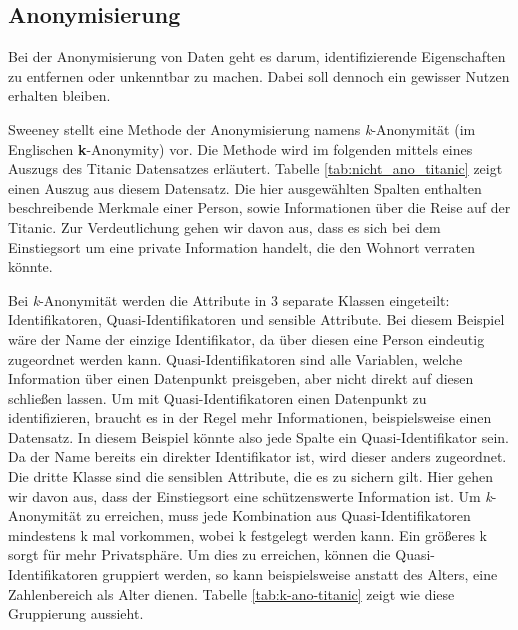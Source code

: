 \subsection{Anonymisierung}\label{sec:anonymisierung}

Bei der Anonymisierung von Daten geht es darum, identifizierende Eigenschaften zu entfernen oder unkenntbar zu machen.
Dabei soll dennoch ein gewisser Nutzen erhalten bleiben. 

Sweeney \cite{P-23} stellt eine Methode der Anonymisierung namens \textit{k}-Anonymität (im Englischen \textbf{k}-Anonymity) vor.
Die Methode wird im folgenden mittels eines Auszugs des Titanic Datensatzes \cite{D-titanic} erläutert.
Tabelle \ref{tab:nicht_ano_titanic} zeigt einen Auszug aus diesem Datensatz.
Die hier ausgewählten Spalten enthalten beschreibende Merkmale einer Person, sowie Informationen über die Reise auf der Titanic. 
Zur Verdeutlichung gehen wir davon aus, dass es sich bei dem Einstiegsort um eine private Information handelt, die den Wohnort verraten könnte.



Bei \textit{k}-Anonymität werden die Attribute in 3 separate Klassen eingeteilt: Identifikatoren, Quasi-Identifikatoren und sensible Attribute.
Bei diesem Beispiel wäre der Name der einzige Identifikator, da über diesen eine Person eindeutig zugeordnet werden kann. 
Quasi-Identifikatoren sind alle Variablen, welche Information über einen Datenpunkt preisgeben, aber nicht direkt auf diesen schließen lassen. 
Um mit Quasi-Identifikatoren einen Datenpunkt zu identifizieren, braucht es in der Regel mehr Informationen, beispielsweise einen Datensatz.
In diesem Beispiel könnte also jede Spalte ein Quasi-Identifikator sein.
Da der Name bereits ein direkter Identifikator ist, wird dieser anders zugeordnet.
Die dritte Klasse sind die sensiblen Attribute, die es zu sichern gilt. 
Hier gehen wir davon aus, dass der Einstiegsort eine schützenswerte Information ist.
Um \textit{k}-Anonymität zu erreichen, muss jede Kombination aus Quasi-Identifikatoren mindestens k mal vorkommen, wobei k festgelegt werden kann. 
Ein größeres k sorgt für mehr Privatsphäre.
Um dies zu erreichen, können die Quasi-Identifikatoren gruppiert werden, so kann beispielsweise anstatt des Alters, eine Zahlenbereich als Alter dienen.
Tabelle \ref{tab:k-ano-titanic} zeigt wie diese Gruppierung aussieht.

